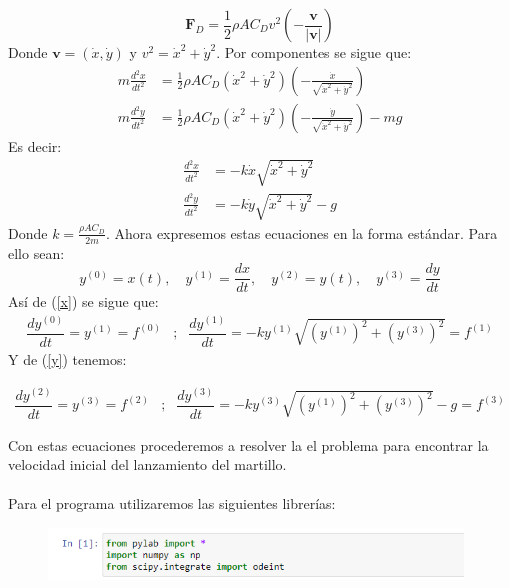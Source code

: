 \documentclass[11pt]{article}
\begin{document}
	$$\bm{F}_D =  \frac{1}{2} \rho AC_D v^2 \left(-\frac{\bm{v}}{|\bm{v}|}\right)$$
	Donde $\bm{v} = (\dot{x}, \dot{y})$ y $v^2 = \dot{x}^2 +\dot{y}^2$.
	Por componentes se sigue que:
	\begin{align*}
		m\frac{d^2 x}{dt^2} &= \frac{1}{2}\rho A C_D (\dot{x}^2 + \dot{y}^2)\left(-\frac{\dot{x}}{\sqrt{\dot{x}^2 +\dot{y}^2}}\right)		\\
		m\frac{d^2 y}{dt^2} &= \frac{1}{2}\rho A C_D (\dot{x}^2 + \dot{y}^2)\left(-\frac{\dot{y}}{\sqrt{\dot{x}^2 +\dot{y}^2}}\right)	-mg	
	\end{align*}
	Es decir:
	\begin{align}
		\frac{d^2 x}{dt^2} &= -k \dot{x}\sqrt{\dot{x}^2 +\dot{y}^2}	\label{x}\\
		\frac{d^2 y}{dt^2} &= -k \dot{y}\sqrt{\dot{x}^2 +\dot{y}^2}	-g	\label{y}
	\end{align}
	Donde $k=\frac{\rho A C_D}{2m}$. Ahora expresemos estas ecuaciones en la forma estándar. Para ello sean:
	$$y^{(0)} = x(t),\quad y^{(1)} = \dfrac{dx}{dt},\quad y^{(2)} = y(t),\quad y^{(3)} = \dfrac{dy}{dt}$$
	Así de (\ref{x})  se sigue que:
		\begin{equation}
			\begin{array}{ccc}
			\dfrac{dy^{(0)}}{dt }= y^{(1)} = f^{(0)}  &;&  \dfrac{dy^{(1)}}{dt} = -k y^{(1)} \sqrt{(y^{(1)})^2 + (y^{(3)})^2}=f^{(1)}	\label{ii}
		\end{array}
		\end{equation}
	Y de (\ref{y}) tenemos:

	\begin{equation}
		\begin{array}{ccc}
			\dfrac{d y^{(2)}}{dt} = y^{(3)} = f^{(2)} &;&  \dfrac{dy^{(3)}}{dt} = -k y^{(3)} \sqrt{(y^{(1)})^2 + (y^{(3)})^2} - g = f^{(3)}	\label{iii}
		\end{array}
	\end{equation}
	
	Con estas ecuaciones procederemos a resolver la el problema para encontrar la velocidad inicial del lanzamiento del martillo.\\\\
	Para el programa utilizaremos las siguientes librerías:
	\begin{figure}[h]
		\centering
		\includegraphics[width=11cm]{Img/1.PNG}
	\end{figure}
\end{document}

